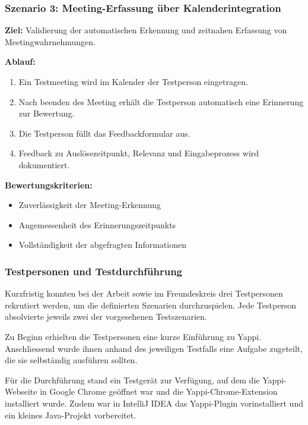 \documentclass[12pt,a4paper]{report}
\begin{document}
    \subsubsection{Szenario 3: Meeting-Erfassung über Kalenderintegration}
    \textbf{Ziel:} Validierung der automatischen Erkennung und zeitnahen Erfassung von Meetingwahrnehmungen.

    \textbf{Ablauf:}
    \begin{enumerate}
        \item Ein Testmeeting wird im Kalender der Testperson eingetragen.
        \item Nach beenden des Meeting erhält die Testperson automatisch eine Erinnerung zur Bewertung.
        \item Die Testperson füllt das Feedbackformular aus.
        \item Feedback zu Auslösezeitpunkt, Relevanz und Eingabeprozess wird dokumentiert.
    \end{enumerate}

    \textbf{Bewertungskriterien:}
    \begin{itemize}
        \item Zuverlässigkeit der Meeting-Erkennung
        \item Angemessenheit des Erinnerungszeitpunkts
        \item Vollständigkeit der abgefragten Informationen
    \end{itemize}

    \subsubsection{Testpersonen und Testdurchführung}

        Kurzfristig konnten bei der Arbeit sowie im Freundeskreis drei Testpersonen rekrutiert werden, um die definierten
        Szenarien durchzuspielen.
        Jede Testperson absolvierte jeweils zwei der vorgesehenen Testszenarien.

        Zu Beginn erhielten die Testpersonen eine kurze Einführung zu Yappi. Anschliessend wurde ihnen anhand des
        jeweiligen Testfalls eine Aufgabe zugeteilt, die sie selbständig ausführen sollten.

        Für die Durchführung stand ein Testgerät zur Verfügung, auf dem die Yappi-Webseite in Google Chrome geöffnet
        war und die Yappi-Chrome-Extension installiert wurde. Zudem war in IntelliJ IDEA das Yappi-Plugin vorinstalliert
        und ein kleines Java-Projekt vorbereitet.
\end{document}
